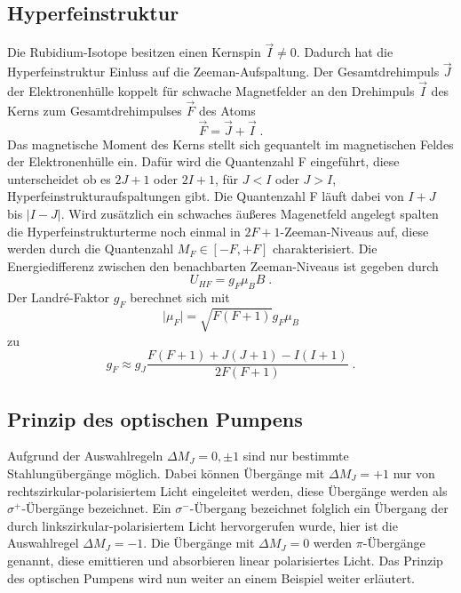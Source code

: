 \subsection{Hyperfeinstruktur}
Die Rubidium-Isotope besitzen einen Kernspin $\vec{I} \neq 0$. Dadurch hat die Hyperfeinstruktur 
Einluss auf die Zeeman-Aufspaltung. Der Gesamtdrehimpuls $\vec{J}$ der Elektronenhülle koppelt 
für schwache Magnetfelder an den Drehimpuls $\vec{I}$ des Kerns zum Gesamtdrehimpulses $\vec{F}$ 
des Atoms
\begin{equation}
\vec{F} = \vec{J} + \vec{I} \; .
\label{eq:F}
\end{equation}
Das magnetische Moment des Kerns stellt sich gequantelt im magnetischen Feldes der Elektronenhülle 
ein. Dafür wird die Quantenzahl F eingeführt, diese unterscheidet ob es $2J+1$ oder $2I+1$, 
für $J<I$ oder $J>I$, Hyperfeinstrukturaufspaltungen gibt. Die Quantenzahl F läuft dabei 
von $I+J$ bis $\lvert I-J \rvert$. Wird zusätzlich ein schwaches äußeres Magenetfeld angelegt 
spalten die Hyperfeinstrukturterme noch einmal in $2F+1$-Zeeman-Niveaus auf, diese werden durch 
die Quantenzahl $M_F \in [-F,+F]$ charakterisiert. Die Energiedifferenz zwischen den benachbarten 
Zeeman-Niveaus ist gegeben durch 
\begin{equation}
U_{HF} = g_F \mu_B B \; .	
\label{eq:UHF}
\end{equation}
Der Landr\'{e}-Faktor $g_F$ berechnet sich mit 
\begin{equation}
\lvert \mu_F \rvert = \sqrt{F(F+1)} g_F \mu_B	
\label{eq:muF}
\end{equation}
zu 
\begin{equation}
g_F \approx g_J \frac{F(F+1) + J(J+1) -I(I+1)}{2F(F+1)} \; .	
\end{equation}

\subsection{Prinzip des optischen Pumpens}
Aufgrund der Auswahlregeln $\Delta M_J = 0, \pm 1$ sind nur bestimmte Stahlungübergänge möglich. 
Dabei können Übergänge mit $\Delta M_J = +1$ nur von rechtszirkular-polarisiertem Licht 
eingeleitet werden, diese Übergänge werden als $\sigma^+$-Übergänge bezeichnet. Ein 
$\sigma^-$-Übergang bezeichnet folglich ein Übergang der durch linkszirkular-polarisiertem 
Licht hervorgerufen wurde, hier ist die Auswahlregel $\Delta M_J = -1$. Die Übergänge mit 
$\Delta M_J = 0$ werden $\pi$-Übergänge genannt, diese emittieren und absorbieren 
linear polarisiertes Licht. Das Prinzip des optischen Pumpens wird nun weiter an einem 
Beispiel weiter erläutert.
